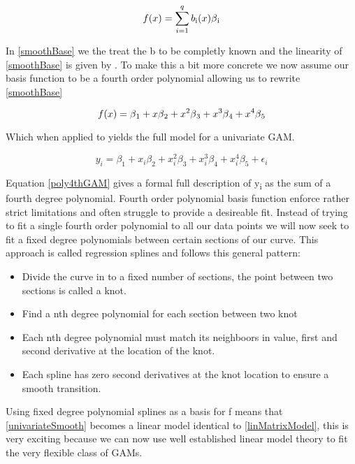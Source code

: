 \documentclass{article}
\begin{document}
    \begin{equation} \label{smoothBase} f(x) = \sum_{i=1}^{q} b\textsubscript{i} (x) \beta \textsubscript{i} \end{equation}

    In \ref{smoothBase} we the treat the b to be completly known and the linearity of \ref{smoothBase} is given by \textbeta. To make this a bit more concrete we now assume our basis function to be a fourth order polynomial allowing us to rewrite \ref{smoothBase}

    \begin{equation} \label{poly4th} f(x) = \beta \textsubscript{1} + x\beta \textsubscript{2} + x^2\beta \textsubscript{3} + x^3\beta \textsubscript{4} + x^4\beta \textsubscript{5}  \end{equation}

    Which when applied to \label{univariateSmooth} yields the full model for a univariate GAM.

    \begin{equation} \label{poly4thGAM}  y_i = \beta_1 + x_i\beta_2 + x_i^2\beta_3+ x_i^3\beta_4 + x_i^4\beta_5 + \epsilon_i \end{equation}

    Equation \ref{poly4thGAM} gives a formal full description of  y\textsubscript{i} as the sum of a fourth degree polynomial. Fourth order polynomial basis function enforce rather strict limitations and often struggle to provide a desireable fit. Instead of trying to fit a single fourth order polynomial to all our data points we will now seek to fit a fixed degree polynomials between certain sections of our curve. This approach is called regression splines and follows this general pattern:
    \begin{itemize}

    \item Divide the curve in to a fixed number of sections, the point between two sections is called a knot.
    \item Find a nth degree polynomial for each section between two knot
    \item Each nth degree polynomial must match its neighboors in value, first and second derivative at the location of the knot.
    \item Each spline has zero second derivatives at the knot location to ensure a smooth transition.

    \end{itemize}

    Using fixed degree polynomial splines as a basis for f means that \ref{univariateSmooth} becomes a linear model identical to \ref{linMatrixModel}, this is very exciting because we can now use well established linear model theory to fit the very flexible class of GAMs.
\end{document}
